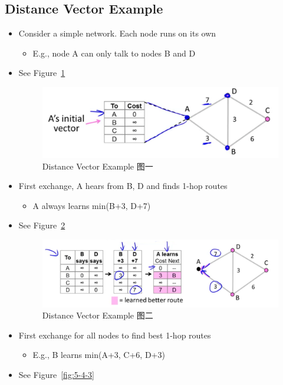 \documentclass[12pt]{ctexart}   %
\begin{document}
	\subsection{Distance Vector Example}
	\begin{itemize}
		\item Consider a simple network. Each node runs on its own
		\begin{itemize}
			\item E.g., node A can only talk to nodes B and D
		\end{itemize}
		\item See Figure~\ref{fig:5-4-1}
			
		\begin{figure}[h!] %
		\centering
		 \includegraphics[scale=0.7]{images/5-4-1}
		\caption{ Distance Vector Example 图一 }
		 \label{fig:5-4-1}
		 \end{figure}
		 
		 \item First exchange, A hears from B, D and finds 1-hop routes
		 \begin{itemize}
		 	\item A always learns min(B+3, D+7)
		 \end{itemize}
		 \item See Figure~\ref{fig:5-4-2}
			
		\begin{figure}[h!] %
		\centering
		 \includegraphics[scale=0.7]{images/5-4-2}
		\caption{ Distance Vector Example 图二 }
		 \label{fig:5-4-2}
		 \end{figure}
		 
		 \item First exchange for all nodes to find best 1-hop routes
		 \begin{itemize}
		 	\item E.g., B learns min(A+3, C+6, D+3)
		 \end{itemize}
		 \item See Figure~\ref{fig:5-4-3}
			

\end{itemize}
\end{document}
